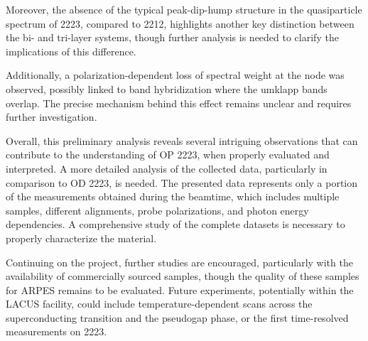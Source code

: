 Moreover, the absence of the typical peak-dip-hump structure in the quasiparticle spectrum of 2223, compared to 2212, highlights another key distinction between the bi- and tri-layer systems, though further analysis is needed to clarify the implications of this difference.

Additionally, a polarization-dependent loss of spectral weight at the node was observed, possibly linked to band hybridization where the umklapp bands overlap.
The precise mechanism behind this effect remains unclear and requires further investigation.

Overall, this preliminary analysis reveals several intriguing observations that can contribute to the understanding of OP 2223, when properly evaluated and interpreted.
A more detailed analysis of the collected data, particularly in comparison to OD 2223, is needed.
The presented data represents only a portion of the measurements obtained during the beamtime, which includes multiple samples, different alignments, probe polarizations, and photon energy dependencies.
A comprehensive study of the complete datasets is necessary to properly characterize the material.

Continuing on the project, further studies are encouraged, particularly with the availability of commercially sourced samples, though the quality of these samples for ARPES remains to be evaluated.
Future experiments, potentially within the LACUS facility, could include temperature-dependent scans across the superconducting transition and the pseudogap phase, or the first time-resolved measurements on 2223.